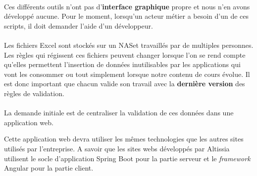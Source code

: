 
\paragraph{}
Ces différents outils n'ont pas d'\textbf{interface graphique} propre et nous n'en avons développé aucune.
Pour le moment, lorsqu'un acteur métier a besoin d'un de ces scripts, il doit demander l'aide d'un développeur.

\paragraph{}
Les fichiers Excel sont stockés sur un NAS\fnmark et travaillés par de multiples personnes.
Les règles qui régissent ces fichiers peuvent changer lorsque l'on se rend compte qu'elles permettent l'insertion de données inutilisables par les applications qui vont les consommer ou tout simplement lorsque notre contenu de cours évolue.
Il est donc important que chacun valide son travail avec la \textbf{dernière version} des règles de validation.


\paragraph{}
La demande initiale est de centraliser la validation de ces données dans une application web.

Cette application web devra utiliser les mêmes technologies que les autres sites utilisés par l'entreprise. A savoir que les sites webs développés par Altissia utilisent le socle d'application Spring Boot pour la partie serveur et le \textit{framework} Angular pour la partie client\fnmark.

